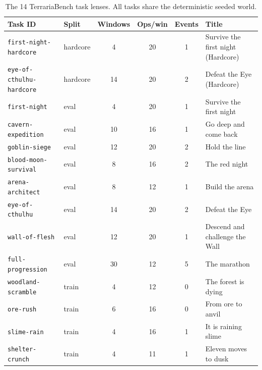 \documentclass[10pt,letterpaper]{article}
\begin{document}
\begin{table}[h]
\centering
\caption{The 14 TerrariaBench task lenses. All tasks share the deterministic seeded world.}
\label{tab:tasks}
\begin{tabular}{llcccl}
\toprule
Task ID & Split & Windows & Ops/win & Events & Title \\
\midrule
\texttt{first-night-hardcore} & hardcore & 4 & 20 & 1 & Survive the first night (Hardcore) \\
\texttt{eye-of-cthulhu-hardcore} & hardcore & 14 & 20 & 2 & Defeat the Eye (Hardcore) \\
\midrule
\texttt{first-night} & eval & 4 & 20 & 1 & Survive the first night \\
\texttt{cavern-expedition} & eval & 10 & 16 & 1 & Go deep and come back \\
\texttt{goblin-siege} & eval & 12 & 20 & 2 & Hold the line \\
\texttt{blood-moon-survival} & eval & 8 & 16 & 2 & The red night \\
\texttt{arena-architect} & eval & 8 & 12 & 1 & Build the arena \\
\texttt{eye-of-cthulhu} & eval & 14 & 20 & 2 & Defeat the Eye \\
\texttt{wall-of-flesh} & eval & 12 & 20 & 1 & Descend and challenge the Wall \\
\texttt{full-progression} & eval & 30 & 12 & 5 & The marathon \\
\midrule
\texttt{woodland-scramble} & train & 4 & 12 & 0 & The forest is dying \\
\texttt{ore-rush} & train & 6 & 16 & 0 & From ore to anvil \\
\texttt{slime-rain} & train & 4 & 16 & 1 & It is raining slime \\
\texttt{shelter-crunch} & train & 4 & 11 & 1 & Eleven moves to dusk \\
\bottomrule
\end{tabular}
\end{table}
\end{document}

